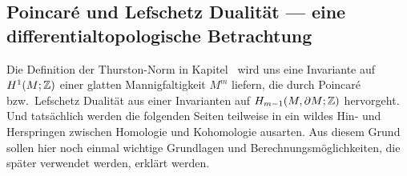 \subsection{Poincaré und Lefschetz Dualität --- eine differentialtopologische Betrachtung}
\label{sec:poinc}

	Die Definition der Thurston-Norm in Kapitel~ wird uns eine Invariante auf $H^1(M;\mathbb{Z})$ einer glatten Mannigfaltigkeit $M^m$ liefern, die durch Poincaré bzw.\ Lefschetz Dualität aus einer Invarianten auf $H_{m-1}(M,\partial M;\mathbb{Z})$ hervorgeht. Und tatsächlich werden die folgenden Seiten teilweise in ein wildes Hin- und Herspringen zwischen Homologie und Kohomologie ausarten. Aus diesem Grund sollen hier noch einmal wichtige Grundlagen und Berechnungsmöglichkeiten, die später verwendet werden, erklärt werden.

